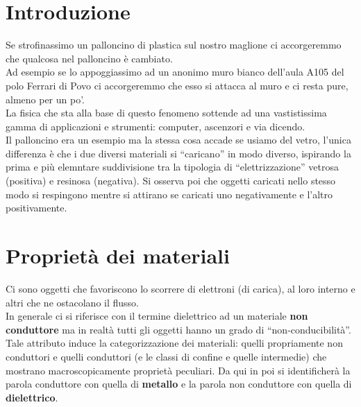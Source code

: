 \documentclass[11pt]{article}
\begin{document}
\section{Introduzione}
Se strofinassimo un palloncino di plastica sul nostro maglione ci accorgeremmo che qualcosa nel palloncino è cambiato.\\Ad esempio se lo appoggiassimo ad un anonimo muro bianco dell'aula A105 del polo Ferrari di Povo ci accorgeremmo che esso si attacca al muro e ci resta pure, almeno per un po'.\\La fisica che sta alla base di questo fenomeno sottende ad una vastistissima gamma di applicazioni e strumenti: computer, ascenzori e via dicendo.\\Il palloncino era un esempio ma la stessa cosa accade se usiamo del vetro, l'unica differenza è che i due diversi materiali si ``caricano'' in modo diverso, ispirando la prima e più elemntare suddivisione tra la tipologia di ``elettrizzazione'' vetrosa (positiva) e resinosa (negativa).
Si osserva poi che oggetti caricati nello stesso modo si respingono mentre si attirano se caricati uno negativamente e l'altro positivamente.
\section{Proprietà dei materiali}
Ci sono oggetti che favoriscono lo scorrere di elettroni (di carica), al loro interno e altri che ne ostacolano il flusso.\\In generale ci si riferisce con il termine dielettrico ad un materiale \textbf{non conduttore} ma in realtà tutti gli oggetti hanno un grado di ``non-conducibilità''.\\Tale attributo induce la categorizzazione dei materiali: quelli propriamente non conduttori e quelli conduttori (e le classi di confine e quelle intermedie) che mostrano macroscopicamente proprietà peculiari. Da qui in poi si identificherà la parola conduttore con quella di \textbf{metallo} e la parola non conduttore con quella di \textbf{dielettrico}.
\end{document}
